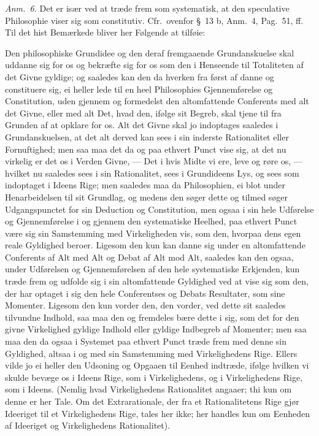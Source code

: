 \documentclass[12pt,a4paper]{book}
\newcommand{\apage}[1]{\marginnote{\footnotesize\textit{[#1]}}}
\begin{document}
{\small\emph{Anm.~6.} Det er især ved at træde frem som systematisk, at den
speculative Philosophie viser sig som constitutiv. Cfr.\ ovenfor \S~13 b, Anm.~4,
Pag.\ 51, ff. Til det hist Bemærkede bliver her Følgende at tilføie:\par}
  \apage{76}
{\small

Den philosophiske Grundidee og den deraf fremgaaende Grundanskuelse skal
uddanne sig for os og bekræfte sig for os som den i Henseende til Totaliteten af det
Givne gyldige; og saaledes kan den da hverken fra først af danne og constituere sig,
ei heller lede til en heel Philosophies Gjennemførelse og Constitution, uden gjennem
og formedelst den altomfattende Conferents med alt det Givne, eller med alt Det, hvad
den, ifølge sit Begreb, skal tjene til fra Grunden af at opklare for os. Alt det
Givne skal jo indoptages saaledes i Grundanskuelsen, at det alt derved kan sees i sin
inderste Rationalitet eller Fornuftighed; men saa maa det da og paa ethvert Punct
vise sig, at det nu virkelig er det os i Verden Givne, --- Det i hvis Midte vi ere,
leve og røre os, --- hvilket nu saaledes sees i sin Rationalitet, sees i Grundideens
Lys, og sees som indoptaget i Ideens Rige; men saaledes maa da Philosophien, ei blot
under Henarbeidelsen til sit Grundlag, og medens den søger dette og tilmed søger
Udgangspunctet for sin Deduction og Constitution, men ogsaa i sin hele Udførelse og
Gjennemførelse i og gjennem den systematiske Heelhed, paa ethvert Punct være sig sin
Samstemming med Virkeligheden vis, som den, hvorpaa dens egen reale Gyldighed beroer.
Ligesom den kun kan danne sig under en altomfattende Conferents af Alt med Alt og
Debat af Alt mod Alt, saaledes kan den ogsaa, under Udførelsen og Gjennemførelsen af
den hele systematiske Erkjenden, kun træde frem og udfolde sig i sin altomfattende
Gyldighed ved at vise sig som den, der har optaget i sig den hele Conferentses og
Debats Resultater, som sine Momenter. Ligesom den kun vorder den, den vorder, ved
dette sit saaledes tilvundne Indhold, saa maa den og fremdeles bære dette i sig, som
det for den givne Virkelighed gyldige Indhold eller gyldige Indbegreb af Momenter;
men saa maa den da ogsaa i Systemet paa ethvert Punct træde frem med denne sin
Gyldighed, altsaa i og med sin Samstemming med Virkelighedens Rige. Ellers vilde jo
ei heller den Udsoning og Opgaaen til Eenhed indtræde, ifølge hvilken vi skulde
bevæge os i Ideens Rige, som i Virkelighedens, og i Virkelighedens Rige, som i
Ideens. (Nemlig hvad Virkelighedens Rationalitet angaaer; thi kun om denne er her
Tale. Om det Extrarationale, der fra et Rationalitetens Rige gjør Ideeriget til et
Virkelighedens Rige, tales her ikke; her handles kun om Eenheden af Ideeriget og
Virkelighedens Rationalitet).\par} \apage{77} 
\end{document}
